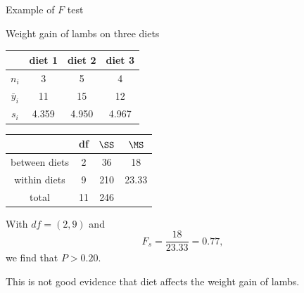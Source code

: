 \begin{frame}{Example of $F$ test}

    Weight gain of lambs on three diets
    \begin{center}
        \begin{tabular}{cccc}
            & diet 1 & diet 2 & diet 3 \\
            \hline
            $n_i$ & 3 & 5 & 4 \\
            $\bar y_i$ & 11 & 15 & 12 \\
            $s_i$ & 4.359 & 4.950 & 4.967 \\
        \end{tabular}
    \end{center}

    \pause

    \begin{center}
        \begin{tabular}{cccc}
            & df & $\SS$ & $\MS$ \\
            \hline
            between diets & 2 & 36 & 18 \\
            within diets & 9 & 210 & 23.33 \\
            \hline
            total & 11 & 246 & \\
        \end{tabular}
    \end{center}


    \vspace{2em}

    With $df = (2,9)$ and
    \[ F_s = \frac{ 18 }{ 23.33 } = 0.77 , \]
    we find that $P > 0.20$.


    \vspace{2em}

    \pause
    This is not good evidence that diet affects the weight gain of lambs.


\end{frame}

